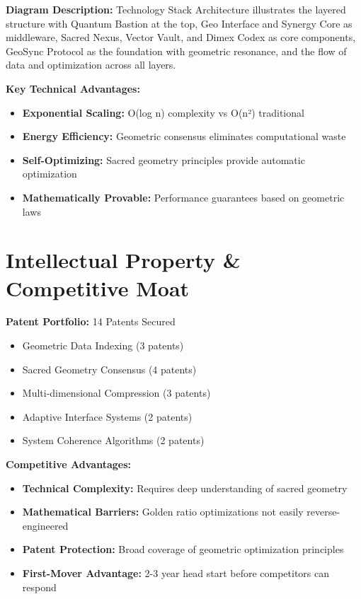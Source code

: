 \documentclass{article}
\begin{document}
\textbf{Diagram Description:} Technology Stack Architecture illustrates the layered structure with Quantum Bastion at the top, Geo Interface and Synergy Core as middleware, Sacred Nexus, Vector Vault, and Dimex Codex as core components, GeoSync Protocol as the foundation with geometric resonance, and the flow of data and optimization across all layers.

\textbf{Key Technical Advantages:}
\begin{itemize}
    \item \textbf{Exponential Scaling:} O(log n) complexity vs O(n²) traditional
    \item \textbf{Energy Efficiency:} Geometric consensus eliminates computational waste
    \item \textbf{Self-Optimizing:} Sacred geometry principles provide automatic optimization
    \item \textbf{Mathematically Provable:} Performance guarantees based on geometric laws
\end{itemize}

\section{Intellectual Property \& Competitive Moat}
\textbf{Patent Portfolio:} 14 Patents Secured
\begin{itemize}
    \item Geometric Data Indexing (3 patents)
    \item Sacred Geometry Consensus (4 patents)
    \item Multi-dimensional Compression (3 patents)
    \item Adaptive Interface Systems (2 patents)
    \item System Coherence Algorithms (2 patents)
\end{itemize}

\textbf{Competitive Advantages:}
\begin{itemize}
    \item \textbf{Technical Complexity:} Requires deep understanding of sacred geometry
    \item \textbf{Mathematical Barriers:} Golden ratio optimizations not easily reverse-engineered
    \item \textbf{Patent Protection:} Broad coverage of geometric optimization principles
    \item \textbf{First-Mover Advantage:} 2-3 year head start before competitors can respond
\end{itemize}
\end{document}
